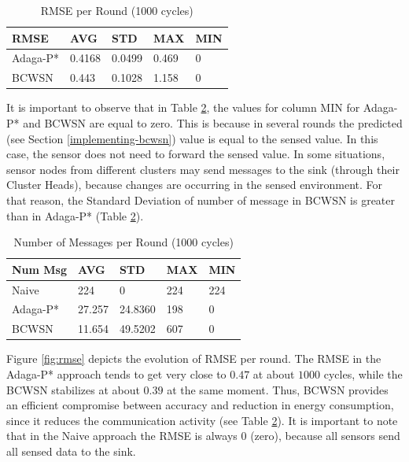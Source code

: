 \documentclass{acm_proc_article-sp}
\begin{document}
\begin{table}[h!]
\small
\caption{RMSE per Round (1000 cycles)}
\label{tab:rmse}
\begin{center}
\begin{tabular}{|l||l|l|l|l|}
\hline
RMSE &AVG &STD &MAX &MIN \\
\hline\hline
Adaga-P* &0.4168 &0.0499 &0.469 &0 \\
\hline
BCWSN &0.443 &0.1028 &1.158 &0 \\
\hline
\end{tabular}
\end{center}
\end{table}

It is important to observe that in Table \ref{tab:num-msg}, the values for
column MIN for Adaga-P* and BCWSN are equal to zero. This is because in several
rounds the predicted (see Section \ref{implementing-bcwsn}) value is equal to
the sensed value. In this case, the sensor does not need to forward the sensed
value. In some situations, sensor nodes from different clusters may send 
messages to the sink (through their Cluster Heads), because changes are
occurring in the sensed environment. For that reason, the Standard Deviation of
number of message in BCWSN is greater than in Adaga-P* (Table
\ref{tab:num-msg}).

\begin{table}[h!]
\small
\caption{Number of Messages per Round (1000 cycles)}
\label{tab:num-msg}
\begin{center}
\begin{tabular}{|l||l|l|l|l|}
\hline
Num Msg &AVG &STD &MAX &MIN \\
\hline\hline
Naive &224 &0 &224 &224 \\
\hline
Adaga-P* &27.257 &24.8360 &198 &0 \\
\hline
BCWSN &11.654 &49.5202 &607 &0 \\
\hline
\end{tabular}
\end{center}
\end{table}
\vspace*{-.3cm}


Figure \ref{fig:rmse} depicts the evolution of RMSE per round. The RMSE in the
Adaga-P* approach tends to get very close to $0.47$ at about $1000$ cycles,
while the BCWSN stabilizes at about $0.39$ at the same moment. Thus, BCWSN
provides an efficient compromise between accuracy and reduction in energy
consumption, since it reduces the communication activity (see Table
\ref{tab:num-msg}). It is important to note that in the Naive approach the RMSE
is always 0 (zero), because all sensors send all sensed data to the sink.
\vspace*{-.3cm}
\end{document}

